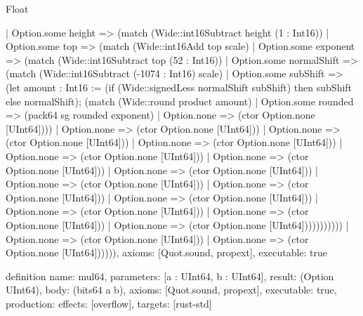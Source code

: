 \begin{lexlean}{Float}
\begin{semanticmodule}
{                      | Option.some height => (match (Wide::int16Subtract height (1 : Int16))
                        | Option.some top => (match (Wide::int16Add top scale)
                          | Option.some exponent => (match (Wide::int16Subtract top (52 : Int16))
                            | Option.some normalShift => (match (Wide::int16Subtract (-1074 : Int16) scale)
                              | Option.some subShift => (let amount : Int16 := (if (Wide::signedLess normalShift subShift) then subShift else normalShift); (match (Wide::round product amount)
                                | Option.some rounded => (pack64 sg rounded exponent)
                                | Option.none => (ctor Option.none [UInt64])))
                              | Option.none => (ctor Option.none [UInt64]))
                            | Option.none => (ctor Option.none [UInt64]))
                          | Option.none => (ctor Option.none [UInt64]))
                        | Option.none => (ctor Option.none [UInt64]))
                      | Option.none => (ctor Option.none [UInt64]))
                    | Option.none => (ctor Option.none [UInt64]))
                  | Option.none => (ctor Option.none [UInt64]))
                | Option.none => (ctor Option.none [UInt64]))
              | Option.none => (ctor Option.none [UInt64]))
            | Option.none => (ctor Option.none [UInt64]))
          | Option.none => (ctor Option.none [UInt64]))
        | Option.none => (ctor Option.none [UInt64]))))))))))
      | Option.none => (ctor Option.none [UInt64]))
    | Option.none => (ctor Option.none [UInt64]))))),
  axioms: [Quot.sound, propext],
  executable: true
}

definition{
  name: mul64,
  parameters: [a : UInt64, b : UInt64],
  result: (Option UInt64),
  body: (bits64 a b),
  axioms: [Quot.sound, propext],
  executable: true,
  production: {effects: [overflow], targets: [rust-std]}
}


\end{semanticmodule}
\end{lexlean}
